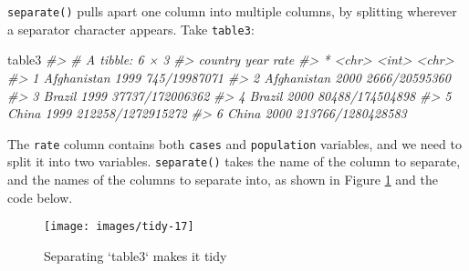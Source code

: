 \documentclass[]{book}
\newenvironment{Shaded}{\begin{snugshade}}{\end{snugshade}}
\newcommand{\KeywordTok}[1]{\textcolor[rgb]{0.13,0.29,0.53}{\textbf{{#1}}}}
\newcommand{\DataTypeTok}[1]{\textcolor[rgb]{0.13,0.29,0.53}{{#1}}}
\newcommand{\StringTok}[1]{\textcolor[rgb]{0.31,0.60,0.02}{{#1}}}
\newcommand{\CommentTok}[1]{\textcolor[rgb]{0.56,0.35,0.01}{\textit{{#1}}}}
\newcommand{\NormalTok}[1]{{#1}}
\begin{document}
\texttt{separate()} pulls apart one column into multiple columns, by
splitting wherever a separator character appears. Take \texttt{table3}:

\begin{Shaded}
\begin{Highlighting}[]
\NormalTok{table3}
\CommentTok{#> # A tibble: 6 × 3}
\CommentTok{#>       country  year              rate}
\CommentTok{#> *       <chr> <int>             <chr>}
\CommentTok{#> 1 Afghanistan  1999      745/19987071}
\CommentTok{#> 2 Afghanistan  2000     2666/20595360}
\CommentTok{#> 3      Brazil  1999   37737/172006362}
\CommentTok{#> 4      Brazil  2000   80488/174504898}
\CommentTok{#> 5       China  1999 212258/1272915272}
\CommentTok{#> 6       China  2000 213766/1280428583}
\end{Highlighting}
\end{Shaded}

The \texttt{rate} column contains both \texttt{cases} and
\texttt{population} variables, and we need to split it into two
variables. \texttt{separate()} takes the name of the column to separate,
and the names of the columns to separate into, as shown in Figure
\ref{fig:tidy-separate} and the code below.

\begin{Shaded}
\end{Shaded}

\begin{figure}

{\centering \texttt{[image: images/tidy-17]} 

}

\caption{Separating `table3` makes it tidy}\label{fig:tidy-separate}
\end{figure}
\end{document}
